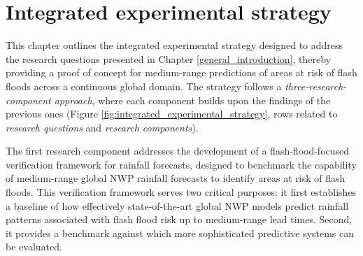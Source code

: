 \chapter{Integrated experimental strategy}
\label{experimental_design}
\graphicspath{{chapter_03/figures}{chapter_03/tables}}


This chapter outlines the integrated experimental strategy designed to address the research questions presented in Chapter \ref{general_introduction}, thereby providing a proof of concept for medium-range predictions of areas at risk of flash floods across a continuous global domain. The strategy follows a \textit{three-research-component approach}, where each component builds upon the findings of the previous ones (Figure \ref{fig:integrated_experimental_strategy}, rows related to \textit{research questions} and \textit{research components}). 

The  first research component addresses the development of a flash-flood-focused verification framework for rainfall forecasts, designed to benchmark the capability of medium-range global NWP rainfall forecasts to identify areas at risk of flash floods. This verification framework serves two critical purposes: it first establishes a baseline of how effectively state-of-the-art global NWP models predict rainfall patterns associated with flash flood risk up to medium-range lead times. Second, it provides a benchmark against which more sophisticated predictive systems can be evaluated.

